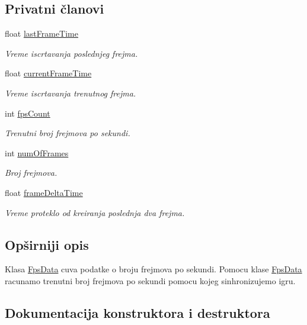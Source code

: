 \subsection*{Privatni članovi}
\begin{DoxyCompactItemize}
\item 
float \hyperlink{classutility_1_1FpsData_a0340fb16b83e32835d5e8327b5b322e3}{last\+Frame\+Time}
\begin{DoxyCompactList}\small\item\em Vreme iscrtavanja poslednjeg frejma. \end{DoxyCompactList}\item 
float \hyperlink{classutility_1_1FpsData_a8d446a1d25857ec240d8fe91a8db0e47}{current\+Frame\+Time}
\begin{DoxyCompactList}\small\item\em Vreme iscrtavanja trenutnog frejma. \end{DoxyCompactList}\item 
int \hyperlink{classutility_1_1FpsData_a72384b61915ece78bad19d36cfc0de41}{fps\+Count}
\begin{DoxyCompactList}\small\item\em Trenutni broj frejmova po sekundi. \end{DoxyCompactList}\item 
int \hyperlink{classutility_1_1FpsData_acbf0bbe28e4d134e959970b252bc1bc1}{num\+Of\+Frames}
\begin{DoxyCompactList}\small\item\em Broj frejmova. \end{DoxyCompactList}\item 
float \hyperlink{classutility_1_1FpsData_ae80cd8b43a338ae4d1d8a03d9d2d5d8e}{frame\+Delta\+Time}
\begin{DoxyCompactList}\small\item\em Vreme proteklo od kreiranja poslednja dva frejma. \end{DoxyCompactList}\end{DoxyCompactItemize}


\subsection{Opširniji opis}
Klasa \hyperlink{classutility_1_1FpsData}{Fps\+Data} cuva podatke o broju frejmova po sekundi. Pomocu klase \hyperlink{classutility_1_1FpsData}{Fps\+Data} racunamo trenutni broj frejmova po sekundi pomocu kojeg sinhronizujemo igru. 

\subsection{Dokumentacija konstruktora i destruktora}
\mbox{\label{classutility_1_1FpsData_a74340a4b4ca45996749c4393fdf6d9b2}} 
